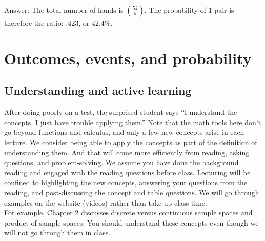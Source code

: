 \documentclass[12pt]{article}
\begin{document}
Answer: The total number of hands is $\binom{52}{5}$.  The probability of 1-pair is therefore the ratio: .423, or 42.4\%. \\

\newpage

\section{Outcomes, events, and probability}

\subsection{Understanding and active learning}

After doing poorly on a test, the surprised student says ``I understand the concepts, I just have trouble applying them.''  Note that the math tools here don't go beyond functions and calculus, and only a few new concepts arise in each lecture.  We consider being able to apply the concepts as part of the definition of understanding them.  And that will come more efficiently from reading, asking questions, and problem-solving.  We assume you have done the background reading and engaged with the reading questions before class.  Lecturing will be confined to highlighting the new concepts, answering your questions from the reading, and post-discussing the concept and table questions.  We will go through examples on the website (videos) rather than take up class time.\\

For example, Chapter 2 discusses discrete versus continuous sample spaces and product of sample spaces.  You should understand these concepts even though we will not go through them in class.


\end{document}
